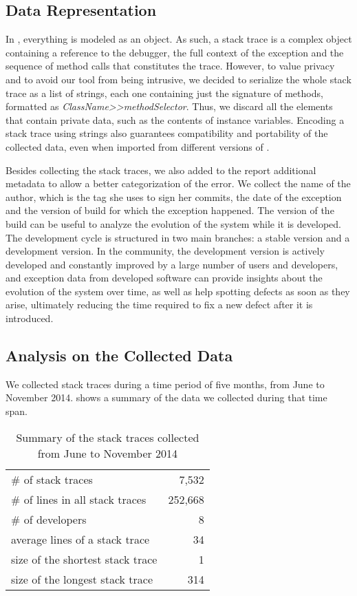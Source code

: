 \subsection{Data Representation}

In \pha, everything is modeled as an object.
As such, a stack trace is a complex object containing a reference to the debugger, the full context of the exception and the sequence of method calls that constitutes the trace.
However, to value privacy and to avoid our tool from being intrusive, we decided to serialize the whole stack trace as a list of strings, each one containing just the signature of methods, formatted as \textit{ClassName{>}{>}methodSelector}.
Thus, we discard all the elements that contain private data, such as the contents of instance variables.
Encoding a stack trace using strings also guarantees compatibility and portability of the collected data, even when imported from different versions of \pha.

Besides collecting the stack traces, we also added to the report additional metadata to allow a better categorization of the error.
We collect the name of the author, which is the tag she uses to sign her commits, the date of the exception and the version of \pha build for which the exception happened.
The version of the build can be useful to analyze the evolution of the system while it is developed.
The \pha development cycle is structured in two main branches: a stable version and a development version.
In the \pha community, the development version is actively developed and constantly improved by a large number of users and developers, and exception data from developed software can provide insights about the evolution of the system over time, as well as help spotting defects as soon as they arise, ultimately reducing the time required to fix a new defect after it is introduced.

\subsection{Analysis on the Collected Data}

We collected stack traces during a time period of five months, from June to November 2014.
 shows a summary of the data we collected during that time span.

\begin{table}[ht]
\caption{Summary of the stack traces collected from June to November 2014}
\begin{center}
\begin{tabular}{lr} \hline
\# of stack traces & 7,532 \\
\# of lines in all stack traces & 252,668 \\
\# of developers & 8 \\
average lines of a stack trace & 34 \\
size of the shortest stack trace & 1 \\
size of the longest stack trace & 314 \\ \hline
\end{tabular}
\end{center}
\label{tab:data-summary}
\end{table}

